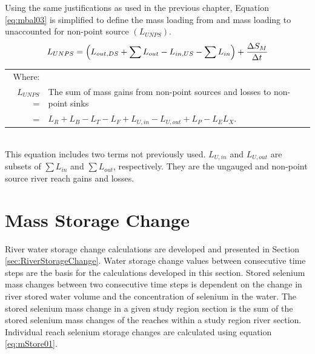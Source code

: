 \begin{linenumbers}
Using the same justifications as used in the previous chapter, Equation \ref{eq:mbal03} is simplified to define the mass loading from and mass loading to unaccounted for non-point source $\left( L_{UNPS} \right) $.
\begin{equation}
	\label{eq:mbal04}
	L_{UNPS} = \left( L_{out,DS} + \sum L_{out} - L_{in,US} - \sum L_{in} \right) + \frac{\Delta S_M}{\Delta t} \\ 
\end{equation}
\begin{tabular}{r p{5.5in}}
	Where: \\
	$ L_{UNPS} $ = & The sum of mass gains from non-point sources and losses to non-point sinks \\
		= &$ L_R + L_B - L_T -L_ F + L_{U,in} - L_{U,out} + L_P - L_E  L_X$.\\ 
\end{tabular}\\

This equation includes two terms not previously used.  $ L_{U,in} $ and $ L_{U,out} $ are subsets of $\displaystyle \sum L_{in} $ and $ \displaystyle \sum L_{out} $, respectively.  They are the ungauged and non-point source river reach gains and losses.
\clearpage

\section{Mass Storage Change}
\label{sec:MassStorageChange}

River water storage change calculations are developed and presented in Section \ref{sec:RiverStorageChange}.  Water storage change values between consecutive time steps are the basis for the calculations developed in this section.  Stored selenium mass changes between two consecutive time steps is dependent on the change in river stored water volume and the concentration of selenium in the water.  The stored selenium mass change in a given study region section is the sum of the stored selenium mass changes of the reaches within a study region river section.  Individual reach selenium storage changes are calculated using equation \ref{eq:mStore01}.


\end{linenumbers}
